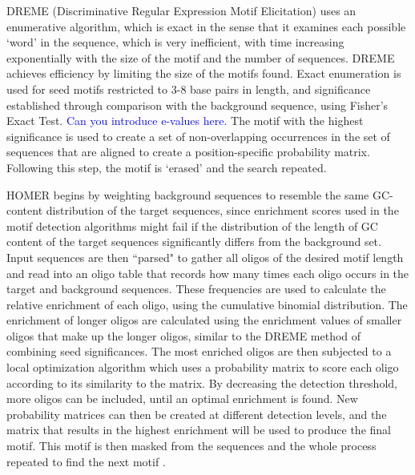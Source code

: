 \documentclass[12pt]{article}
\begin{document}
DREME (Discriminative Regular Expression Motif Elicitation) \citep{bailey2011dreme} uses an enumerative algorithm, which is exact in the sense that it examines each possible `word' in the sequence, which is very inefficient, with time increasing exponentially with the size of the motif and the number of sequences. DREME achieves efficiency by limiting the size of the motifs found. Exact enumeration is used for seed motifs restricted to 3-8 base pairs in length, and significance established through comparison with the background sequence, using Fisher's Exact Test. \textcolor{blue}{Can you introduce e-values here.} The motif with the highest significance is used to create a set of non-overlapping occurrences in the set of sequences that are aligned to create a position-specific probability matrix. Following this step, the motif is `erased' and the search repeated.
 
HOMER \citep{heinz2010simple} begins by weighting background sequences to resemble the same GC-content distribution of the target sequences, since enrichment scores used in the motif detection algorithms might fail if the distribution of the length of GC content of the target sequences significantly
differs from the background set. Input sequences are then ``parsed" to gather all oligos of the desired motif length and read into an oligo table that records how many times each oligo occurs in the target and background sequences. These frequencies are used to calculate the relative enrichment of each oligo, using the cumulative binomial distribution. The enrichment of longer oligos are calculated using the enrichment values of smaller oligos that make up the longer oligos, similar to the DREME method of combining seed significances. The most enriched oligos are then subjected to a local optimization algorithm which uses a probability matrix to score each oligo according to its similarity to the matrix. By decreasing the detection threshold, more oligos can be included, until an optimal enrichment is found. New probability matrices can then be created at different detection levels, and the matrix that results in the highest enrichment will be used to produce the final motif. This motif is then masked from the sequences and the whole process repeated to find the next motif \citep{homer_ws}.
\end{document}
